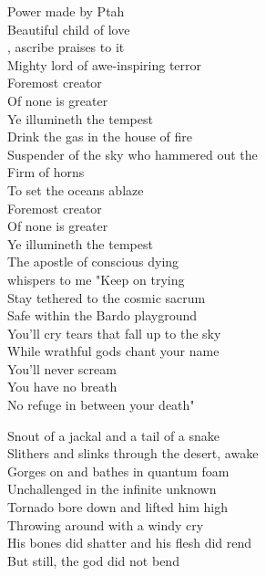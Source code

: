 
Power made by Ptah \\
Beautiful child of love \\
, ascribe praises to it \\
Mighty lord of awe-inspiring terror \\
Foremost creator \\
Of none is greater \\
Ye illumineth the tempest \\

Drink the gas in the house of fire \\
Suspender of the sky who hammered out the  \\
Firm of horns \\
To set the oceans ablaze \\
Foremost creator \\
Of none is greater \\
Ye illumineth the tempest \\

The apostle of conscious dying \\
whispers to me "Keep on trying \\
Stay tethered to the cosmic sacrum \\
Safe within the Bardo playground \\
You'll cry tears that fall up to the sky \\
While wrathful gods chant your name \\
You'll never scream \\
You have no breath \\
No refuge in between your death" \\



Snout of a jackal and a tail of a snake \\
Slithers and slinks through the desert, awake \\
Gorges on  and bathes in quantum foam \\
Unchallenged in the infinite unknown \\

Tornado bore down and lifted him high \\
Throwing  around with a windy cry \\
His bones did shatter and his flesh did rend \\
But still, the god did not bend \\

